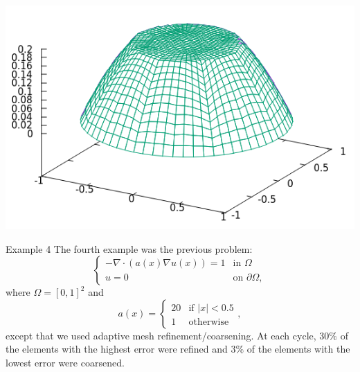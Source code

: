 \documentclass[9pt]{beamer}
\newcommand{\abs}[1]{\left\vert#1\right\vert}
\newcommand{\grad}{\nabla}
\begin{document}
\begin{frame}
\begin{minipage}{.45\paperwidth}
\end{minipage}%
\begin{minipage}{.4\paperwidth}
	\centering
	\includegraphics[scale=.5]{Solu3-3.png}
\end{minipage}
\end{frame}

\begin{frame}{Example 4}
The fourth example was the previous problem:
$$
\begin{cases}
-\grad \cdot(a(x)\grad u(x)) = 1 &\text{in }\Omega\\
u = 0 & \text{on }\partial\Omega,
\end{cases}
$$
where $\Omega = [0,1]^2$ and 
$$
a(x) = \begin{cases}
20 & \text{if }\abs{x} < 0.5\\
1 & \text{otherwise}
\end{cases},
$$
except that we used adaptive mesh refinement/coarsening. At each cycle, $30\%$ of the elements with the highest error were refined and $3\%$ of the elements with the lowest error were coarsened.
\end{frame}
\end{document}
